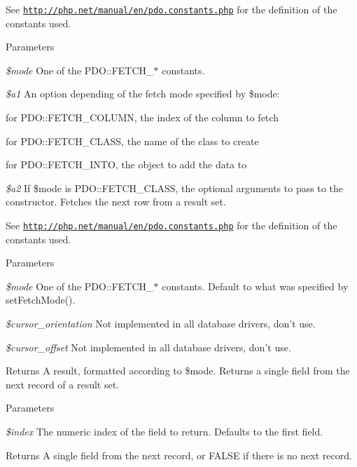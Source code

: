 See \href{http://php.net/manual/en/pdo.constants.php}{\tt http://php.net/manual/en/pdo.constants.php} for the definition of the constants used.


\begin{DoxyParams}{Parameters}
\item[{\em \$mode}]One of the PDO::FETCH\_\-$\ast$ constants. \item[{\em \$a1}]An option depending of the fetch mode specified by \$mode:
\begin{DoxyItemize}
\item for PDO::FETCH\_\-COLUMN, the index of the column to fetch
\item for PDO::FETCH\_\-CLASS, the name of the class to create
\item for PDO::FETCH\_\-INTO, the object to add the data to 
\end{DoxyItemize}\item[{\em \$a2}]If \$mode is PDO::FETCH\_\-CLASS, the optional arguments to pass to the constructor. Fetches the next row from a result set.\end{DoxyParams}
See \href{http://php.net/manual/en/pdo.constants.php}{\tt http://php.net/manual/en/pdo.constants.php} for the definition of the constants used.


\begin{DoxyParams}{Parameters}
\item[{\em \$mode}]One of the PDO::FETCH\_\-$\ast$ constants. Default to what was specified by setFetchMode(). \item[{\em \$cursor\_\-orientation}]Not implemented in all database drivers, don't use. \item[{\em \$cursor\_\-offset}]Not implemented in all database drivers, don't use.\end{DoxyParams}
\begin{DoxyReturn}{Returns}
A result, formatted according to \$mode. Returns a single field from the next record of a result set.
\end{DoxyReturn}

\begin{DoxyParams}{Parameters}
\item[{\em \$index}]The numeric index of the field to return. Defaults to the first field.\end{DoxyParams}
\begin{DoxyReturn}{Returns}
A single field from the next record, or FALSE if there is no next record. 
\end{DoxyReturn}


